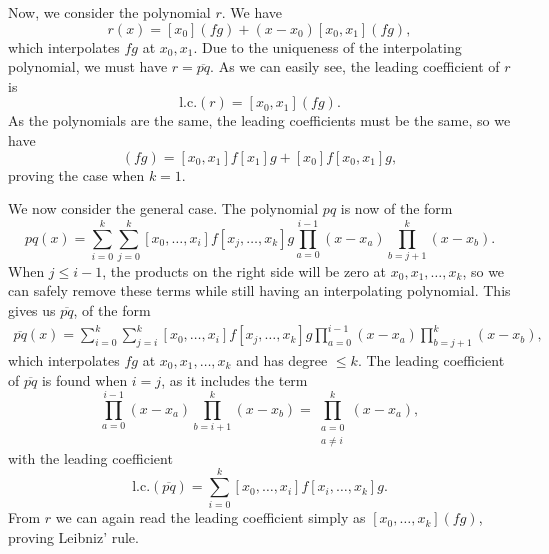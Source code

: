 \begin{solution}
    Now, we consider the polynomial $r$.
    We have
    \begin{equation*}
        r(x) = [x_0](fg) + (x - x_0)[x_0, x_1](fg),
    \end{equation*}
    which interpolates $fg$ at $x_0, x_1$.
    Due to the uniqueness of the interpolating polynomial, we must have $r = \overline{pq}$.
    As we can easily see, the leading coefficient of $r$ is
    \begin{equation*}
        \text{l.c.}(r) = [x_0, x_1](fg).
    \end{equation*}
    As the polynomials are the same, the leading coefficients must be the same, so we have
    \begin{equation*}
        [x_0, x_1](fg) = [x_0, x_1]f [x_1]g + [x_0]f [x_0, x_1]g,
    \end{equation*}
    proving the case when $k = 1$.

    We now consider the general case.
    The polynomial $pq$ is now of the form
    \begin{equation*}
        pq(x) = \sum_{i=0}^{k} \sum_{j=0}^{k} [x_0, \ldots, x_i]f [x_j, \ldots, x_k]g \prod_{a=0}^{i-1} (x - x_a) \prod_{b=j+1}^{k} (x - x_b).
    \end{equation*}
    When $j \leq i - 1$, the products on the right side will be zero at $x_0, x_1, \ldots, x_k$, so we can safely remove these terms while still having an interpolating polynomial.
    This gives us $\overline{pq}$, of the form
    \begin{align*}
        \overline{pq}(x) = \sum_{i=0}^{k} \sum_{j=i}^{k} [x_0, \ldots, x_i]f [x_j, \ldots, x_k]g \prod_{a=0}^{i-1} (x - x_a) \prod_{b=j+1}^{k} (x - x_b),
    \end{align*}
    which interpolates $fg$ at $x_0, x_1, \ldots, x_k$ and has degree $\leq k$.
    The leading coefficient of $\overline{pq}$ is found when $i = j$, as it includes the term
    \begin{equation*}
        \prod_{a=0}^{i-1} (x - x_a) \prod_{b=i+1}^{k} (x - x_b) = \prod_{\substack{a=0 \\ a \neq i}}^{k} (x - x_a),
    \end{equation*}
    with the leading coefficient
    \begin{equation*}
        \text{l.c.}(\overline{pq}) = \sum_{i = 0}^{k} [x_0, \ldots, x_i]f [x_i, \ldots, x_k]g.
    \end{equation*}
    From $r$ we can again read the leading coefficient simply as $[x_0, \ldots, x_k](fg)$, proving Leibniz' rule.
\end{solution}